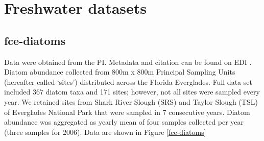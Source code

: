 \documentclass[11pt, oneside]{article}
\begin{document}
\section {Freshwater datasets}

\subsection {fce-diatoms}
Data were obtained from the PI.
Metadata and citation can be found on EDI \citep{fce-diatoms}.
Diatom abundance collected from 800m x 800m Principal Sampling Units (hereafter called `sites') distributed across the Florida Everglades. 
Full data set included 367 diatom taxa and 171 sites; however, not all sites were sampled every year. 
We retained sites from Shark River Slough (SRS) and Taylor Slough (TSL) of Everglades National Park that were sampled in 7 consecutive years. 
Diatom abundance was aggregated as yearly mean of four samples collected per year (three samples for 2006). 
Data are shown in Figure \ref{fce-diatoms}
\end{document}

